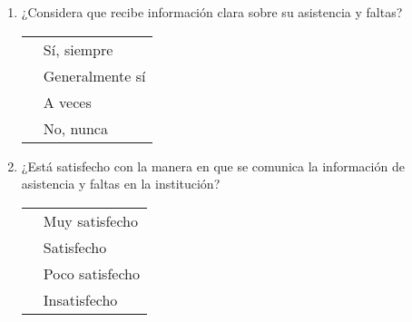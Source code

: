 \documentclass[12pt, a4paper]{article}
\newcommand{\checkbox}{\fbox{\rule{0pt}{1.5ex}\rule{1.5ex}{0pt}}}
\begin{document}
\begin{enumerate}[label=\textbf{A\arabic*}.]
                                                                                                \item ¿Considera que recibe información clara sobre su asistencia y faltas?\\
                                                                                                    \begin{tabular}{ll}
                                                                                                    \checkbox & Sí, siempre \\
                                                                                                        \checkbox & Generalmente sí \\
                                                                                                        \checkbox & A veces \\
                                                                                                        \checkbox & No, nunca \\
                                                                                                        \end{tabular}

                                                                                                        \item ¿Está satisfecho con la manera en que se comunica la información de asistencia y faltas en la institución?\\
                                                                                                            \begin{tabular}{ll}
                                                                                                            \checkbox & Muy satisfecho \\
                                                                                                                \checkbox & Satisfecho \\
                                                                                                                \checkbox & Poco satisfecho \\
                                                                                                                \checkbox & Insatisfecho \\
                                                                                                                \end{tabular}


\end{enumerate}
\end{document}
